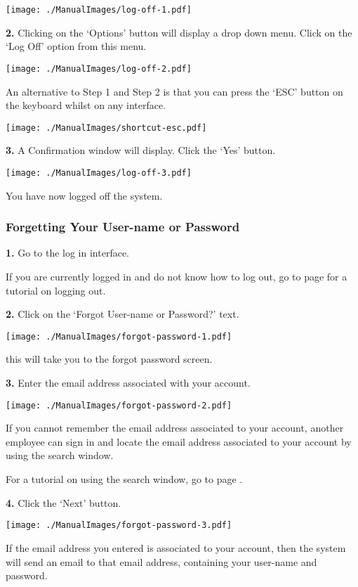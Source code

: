 \texttt{[image: ./ManualImages/log-off-1.pdf]}

\textbf{2.} Clicking on the `Options' button will display a drop down menu. Click on the `Log Off' option from this menu.

\texttt{[image: ./ManualImages/log-off-2.pdf]}

An alternative to Step 1 and Step 2 is that you can press the `ESC' button on the keyboard whilst on any interface.

\texttt{[image: ./ManualImages/shortcut-esc.pdf]}

\textbf{3.} A Confirmation window will display. Click the `Yes' button.

\texttt{[image: ./ManualImages/log-off-3.pdf]}

You have now logged off the system.

\pagebreak
\subsubsection{Forgetting Your User-name or Password}
\label{fig:Forgetting Your User-name or Password}

\textbf{1.} Go to the log in interface.

If you are currently logged in and do not know how to log out, go to page \pageref{fig:Logging out of the system}  for a tutorial on logging out.

\textbf{2.} Click on the `Forgot User-name or Password?' text.

\texttt{[image: ./ManualImages/forgot-password-1.pdf]}

this will take you to the forgot password screen.

\textbf{3.} Enter the email address associated with your account.

\texttt{[image: ./ManualImages/forgot-password-2.pdf]}

If you cannot remember the email address associated to your account, another employee can sign in and locate the email address associated to your account by using the search window.

For a tutorial on using the search window, go to page .

\textbf{4.} Click the `Next' button.

\texttt{[image: ./ManualImages/forgot-password-3.pdf]}

If the email address you entered is associated to your account, then the system will send an email to that email address, containing your user-name and password.

